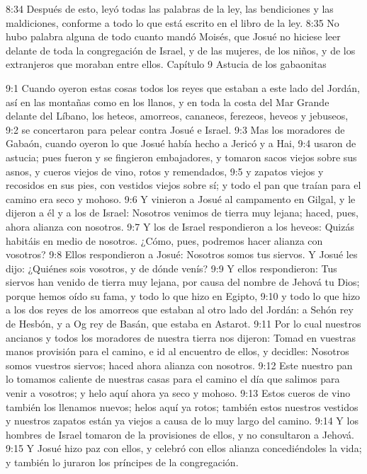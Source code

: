 8:34 Después de esto, leyó todas las palabras de la ley, las bendiciones y las maldiciones, conforme a todo lo que está escrito en el libro de la ley.  
8:35 No hubo palabra alguna de todo cuanto mandó Moisés, que Josué no hiciese leer delante de toda la congregación de Israel, y de las mujeres, de los niños, y de los extranjeros que moraban entre ellos. 
Capítulo 9 
Astucia de los gabaonitas  

9:1 Cuando oyeron estas cosas todos los reyes que estaban a este lado del Jordán, así en las montañas como en los llanos, y en toda la costa del Mar Grande delante del Líbano, los heteos, amorreos, cananeos, ferezeos, heveos y jebuseos,  
9:2 se concertaron para pelear contra Josué e Israel.  
9:3 Mas los moradores de Gabaón, cuando oyeron lo que Josué había hecho a Jericó y a Hai,  
9:4 usaron de astucia; pues fueron y se fingieron embajadores, y tomaron sacos viejos sobre sus asnos, y cueros viejos de vino, rotos y remendados,  
9:5 y zapatos viejos y recosidos en sus pies, con vestidos viejos sobre sí; y todo el pan que traían para el camino era seco y mohoso.  
9:6 Y vinieron a Josué al campamento en Gilgal, y le dijeron a él y a los de Israel: Nosotros venimos de tierra muy lejana; haced, pues, ahora alianza con nosotros.  
9:7 Y los de Israel respondieron a los heveos: Quizás habitáis en medio de nosotros. ¿Cómo, pues, podremos hacer alianza con vosotros?  
9:8 Ellos respondieron a Josué: Nosotros somos tus siervos. Y Josué les dijo: ¿Quiénes sois vosotros, y de dónde venís?  
9:9 Y ellos respondieron: Tus siervos han venido de tierra muy lejana, por causa del nombre de Jehová tu Dios; porque hemos oído su fama, y todo lo que hizo en Egipto,  
9:10 y todo lo que hizo a los dos reyes de los amorreos que estaban al otro lado del Jordán: a Sehón rey de Hesbón, y a Og rey de Basán, que estaba en Astarot. 
9:11 Por lo cual nuestros ancianos y todos los moradores de nuestra tierra nos dijeron: Tomad en vuestras manos provisión para el camino, e id al encuentro de ellos, y decidles: Nosotros somos vuestros siervos; haced ahora alianza con nosotros.  
9:12 Este nuestro pan lo tomamos caliente de nuestras casas para el camino el día que salimos para venir a vosotros; y helo aquí ahora ya seco y mohoso.  
9:13 Estos cueros de vino también los llenamos nuevos; helos aquí ya rotos; también estos nuestros vestidos y nuestros zapatos están ya viejos a causa de lo muy largo del camino.  
9:14 Y los hombres de Israel tomaron de la provisiones de ellos, y no consultaron a Jehová.  
9:15 Y Josué hizo paz con ellos, y celebró con ellos alianza concediéndoles la vida; y también lo juraron los príncipes de la congregación.  
